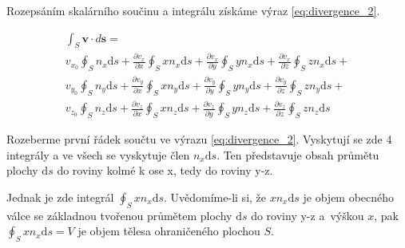 \documentclass{book}
\newcommand{\vect}[1]{\boldsymbol{#1}}
\newcommand{\drawaxes}[5]{   -- x, y, dx, dy, dz
	\draw[->] (#1, #2) -- (#1 + #3, #2);
	\draw (#1 + #3, #2) node[anchor=north]{x};
	
	\draw[->] (#1, #2) -- (#1, #2 + #4);
	\draw (#1, #2 + #4) node[anchor=east]{y};
	
	\draw[->] (#1, #2) -- (#1 - #5, #2 - #5);
	\draw (#1 - #5, #2 - #5) node[anchor=east]{z};
}
\begin{document}
Rozepsáním skalárního součinu a integrálu získáme výraz \eqref{eq:divergence_2}.

\begin{equation}
\label{eq:divergence_2}
\begin{matrix}
\int_S \vect{v} \cdot d\vect{s} = \\
v_{x_0} \oint_S n_x \mathrm{d}s + \frac{\partial v_x}{\partial x} \oint_S x n_x \mathrm{d}s + \frac{\partial v_x}{\partial y} \oint_S y n_x \mathrm{d}s + \frac{\partial v_x}{\partial z} \oint_S z n_x \mathrm{d}s + \\
v_{y_0} \oint_S n_y \mathrm{d}s + \frac{\partial v_y}{\partial x} \oint_S x n_y \mathrm{d}s + \frac{\partial v_y}{\partial y} \oint_S y n_y \mathrm{d}s + \frac{\partial v_y}{\partial z} \oint_S z n_y \mathrm{d}s + \\
v_{z_0} \oint_S n_z \mathrm{d}s + \frac{\partial v_z}{\partial x} \oint_S x n_z \mathrm{d}s + \frac{\partial v_z}{\partial y} \oint_S y n_z \mathrm{d}s + \frac{\partial v_z}{\partial z} \oint_S z n_z \mathrm{d}s
\end{matrix}
\end{equation}

Rozeberme první řádek součtu ve výrazu \eqref{eq:divergence_2}. Vyskytují se zde 4 integrály a ve všech se vyskytuje člen \(n_x \mathrm{d}s\). Ten představuje obsah průmětu plochy \(\mathrm{d}s\) do roviny kolmé k ose x, tedy do roviny y-z.

Jednak je zde integrál \(\oint_S x n_x \mathrm{d}s\). Uvědomíme-li si, že \(x n_x \mathrm{d}s\) je objem obecného válce se základnou tvořenou průmětem plochy \(\mathrm{d}s\) do roviny y-z a~výškou \(x\), pak \(\oint_S x n_x \mathrm{d}s = V\) je objem tělesa ohraničeného plochou \(S\).

\end{document}
